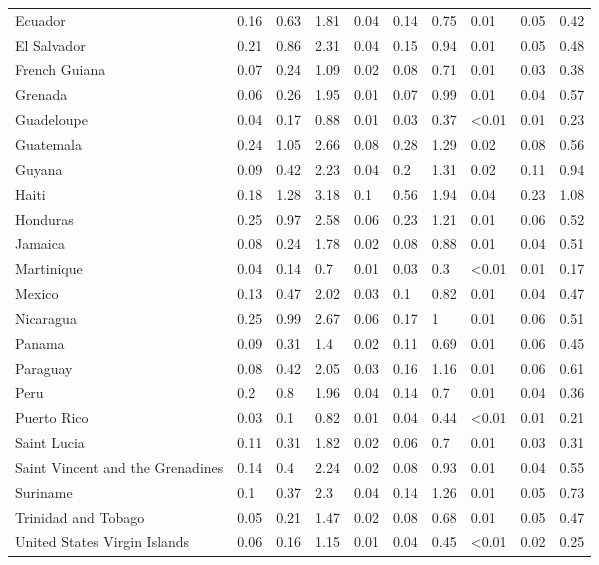 \begin{longtable}[t]{llllllllll}
Ecuador & 0.16 & 0.63 & 1.81 & 0.04 & 0.14 & 0.75 & 0.01 & 0.05 & 0.42\\
El Salvador & 0.21 & 0.86 & 2.31 & 0.04 & 0.15 & 0.94 & 0.01 & 0.05 & 0.48\\
French Guiana & 0.07 & 0.24 & 1.09 & 0.02 & 0.08 & 0.71 & 0.01 & 0.03 & 0.38\\
Grenada & 0.06 & 0.26 & 1.95 & 0.01 & 0.07 & 0.99 & 0.01 & 0.04 & 0.57\\
\addlinespace
Guadeloupe & 0.04 & 0.17 & 0.88 & 0.01 & 0.03 & 0.37 & <0.01 & 0.01 & 0.23\\
Guatemala & 0.24 & 1.05 & 2.66 & 0.08 & 0.28 & 1.29 & 0.02 & 0.08 & 0.56\\
Guyana & 0.09 & 0.42 & 2.23 & 0.04 & 0.2 & 1.31 & 0.02 & 0.11 & 0.94\\
Haiti & 0.18 & 1.28 & 3.18 & 0.1 & 0.56 & 1.94 & 0.04 & 0.23 & 1.08\\
Honduras & 0.25 & 0.97 & 2.58 & 0.06 & 0.23 & 1.21 & 0.01 & 0.06 & 0.52\\
\addlinespace
Jamaica & 0.08 & 0.24 & 1.78 & 0.02 & 0.08 & 0.88 & 0.01 & 0.04 & 0.51\\
Martinique & 0.04 & 0.14 & 0.7 & 0.01 & 0.03 & 0.3 & <0.01 & 0.01 & 0.17\\
Mexico & 0.13 & 0.47 & 2.02 & 0.03 & 0.1 & 0.82 & 0.01 & 0.04 & 0.47\\
Nicaragua & 0.25 & 0.99 & 2.67 & 0.06 & 0.17 & 1 & 0.01 & 0.06 & 0.51\\
Panama & 0.09 & 0.31 & 1.4 & 0.02 & 0.11 & 0.69 & 0.01 & 0.06 & 0.45\\
\addlinespace
Paraguay & 0.08 & 0.42 & 2.05 & 0.03 & 0.16 & 1.16 & 0.01 & 0.06 & 0.61\\
Peru & 0.2 & 0.8 & 1.96 & 0.04 & 0.14 & 0.7 & 0.01 & 0.04 & 0.36\\
Puerto Rico & 0.03 & 0.1 & 0.82 & 0.01 & 0.04 & 0.44 & <0.01 & 0.01 & 0.21\\
Saint Lucia & 0.11 & 0.31 & 1.82 & 0.02 & 0.06 & 0.7 & 0.01 & 0.03 & 0.31\\
Saint Vincent and the Grenadines & 0.14 & 0.4 & 2.24 & 0.02 & 0.08 & 0.93 & 0.01 & 0.04 & 0.55\\
\addlinespace
Suriname & 0.1 & 0.37 & 2.3 & 0.04 & 0.14 & 1.26 & 0.01 & 0.05 & 0.73\\
Trinidad and Tobago & 0.05 & 0.21 & 1.47 & 0.02 & 0.08 & 0.68 & 0.01 & 0.05 & 0.47\\
United States Virgin Islands & 0.06 & 0.16 & 1.15 & 0.01 & 0.04 & 0.45 & <0.01 & 0.02 & 0.25\\

\end{longtable}
